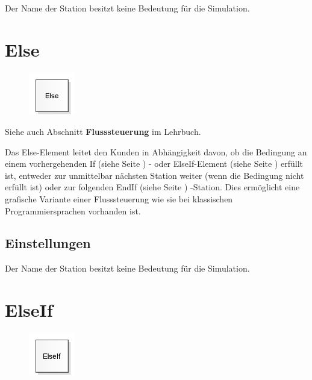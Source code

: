 Der Name der Station besitzt keine Bedeutung für die Simulation.


\section{Else}
\label{ref:ModelElementLogicElse}

\begin{figure}
\vspace{-22pt}
\includegraphics[width=2cm]{imageModelElementLogicElse.png}
\vspace{-22pt}
\end{figure}

Siehe auch Abschnitt \textbf{Flusssteuerung} im Lehrbuch.

Das Else-Element leitet den Kunden in Abhängigkeit davon, ob die Bedingung an einem
vorhergehenden If (siehe Seite \pageref{ref:ModelElementLogicIf}) - oder
ElseIf-Element (siehe Seite \pageref{ref:ModelElementLogicElseIf}) erfüllt ist, entweder
zur unmittelbar nächsten Station weiter (wenn die Bedingung nicht erfüllt ist) oder
zur folgenden EndIf (siehe Seite \pageref{ref:ModelElementLogicEndIf}) -Station.
Dies ermöglicht eine grafische Variante einer Flusssteuerung wie sie bei
klassischen Programmiersprachen vorhanden ist.

\subsection*{Einstellungen}

Der Name der Station besitzt keine Bedeutung für die Simulation.


\section{ElseIf}
\label{ref:ModelElementLogicElseIf}

\begin{figure}
\vspace{-22pt}
\includegraphics[width=2cm]{imageModelElementLogicElseIf.png}
\vspace{-22pt}
\end{figure}

